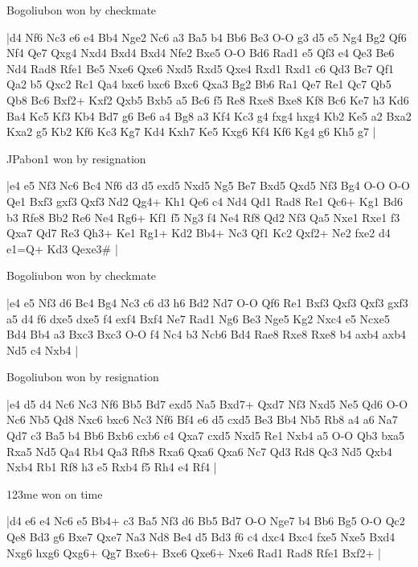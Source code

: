 \showboard

Bogoliubon won by checkmate

\makegametitle
|d4 Nf6 Nc3 e6 e4 Bb4 Nge2 Nc6 a3 Ba5 b4 Bb6 Be3 O-O g3 d5 e5 Ng4 Bg2 Qf6 Nf4 Qe7 Qxg4 Nxd4 Bxd4 Bxd4 Nfe2 Bxe5 O-O Bd6 Rad1 e5 Qf3 e4 Qe3 Be6 Nd4 Rad8 Rfe1 Be5 Nxe6 Qxe6 Nxd5 Rxd5 Qxe4 Rxd1 Rxd1 c6 Qd3 Bc7 Qf1 Qa2 b5 Qxc2 Rc1 Qa4 bxc6 bxc6 Bxc6 Qxa3 Bg2 Bb6 Ra1 Qe7 Re1 Qc7 Qb5 Qb8 Bc6 Bxf2+ Kxf2 Qxb5 Bxb5 a5 Bc6 f5 Re8 Rxe8 Bxe8 Kf8 Bc6 Ke7 h3 Kd6 Ba4 Kc5 Kf3 Kb4 Bd7 g6 Be6 a4 Bg8 a3 Kf4 Kc3 g4 fxg4 hxg4 Kb2 Ke5 a2 Bxa2 Kxa2 g5 Kb2 Kf6 Kc3 Kg7 Kd4 Kxh7 Ke5 Kxg6 Kf4 Kf6 Kg4 g6 Kh5 g7  |

\showboard

JPabon1 won by resignation

\makegametitle
|e4 e5 Nf3 Nc6 Bc4 Nf6 d3 d5 exd5 Nxd5 Ng5 Be7 Bxd5 Qxd5 Nf3 Bg4 O-O O-O Qe1 Bxf3 gxf3 Qxf3 Nd2 Qg4+ Kh1 Qe6 c4 Nd4 Qd1 Rad8 Re1 Qc6+ Kg1 Bd6 b3 Rfe8 Bb2 Re6 Ne4 Rg6+ Kf1 f5 Ng3 f4 Ne4 Rf8 Qd2 Nf3 Qa5 Nxe1 Rxe1 f3 Qxa7 Qd7 Re3 Qh3+ Ke1 Rg1+ Kd2 Bb4+ Nc3 Qf1 Kc2 Qxf2+ Ne2 fxe2 d4 e1=Q+ Kd3 Qexe3\#  |

\showboard

Bogoliubon won by checkmate

\makegametitle
|e4 e5 Nf3 d6 Bc4 Bg4 Nc3 c6 d3 h6 Bd2 Nd7 O-O Qf6 Re1 Bxf3 Qxf3 Qxf3 gxf3 a5 d4 f6 dxe5 dxe5 f4 exf4 Bxf4 Ne7 Rad1 Ng6 Be3 Nge5 Kg2 Nxc4 e5 Ncxe5 Bd4 Bb4 a3 Bxc3 Bxc3 O-O f4 Nc4 b3 Ncb6 Bd4 Rae8 Rxe8 Rxe8 b4 axb4 axb4 Nd5 c4 Nxb4  |

\showboard

Bogoliubon won by resignation

\makegametitle
|e4 d5 d4 Nc6 Nc3 Nf6 Bb5 Bd7 exd5 Na5 Bxd7+ Qxd7 Nf3 Nxd5 Ne5 Qd6 O-O Nc6 Nb5 Qd8 Nxc6 bxc6 Nc3 Nf6 Bf4 e6 d5 cxd5 Be3 Bb4 Nb5 Rb8 a4 a6 Na7 Qd7 c3 Ba5 b4 Bb6 Bxb6 cxb6 c4 Qxa7 cxd5 Nxd5 Re1 Nxb4 a5 O-O Qb3 bxa5 Rxa5 Nd5 Qa4 Rb4 Qa3 Rfb8 Rxa6 Qxa6 Qxa6 Nc7 Qd3 Rd8 Qc3 Nd5 Qxb4 Nxb4 Rb1 Rf8 h3 e5 Rxb4 f5 Rh4 e4 Rf4  |

\showboard

123me won on time

\makegametitle
|d4 e6 e4 Nc6 e5 Bb4+ c3 Ba5 Nf3 d6 Bb5 Bd7 O-O Nge7 b4 Bb6 Bg5 O-O Qc2 Qe8 Bd3 g6 Bxe7 Qxe7 Na3 Nd8 Be4 d5 Bd3 f6 c4 dxc4 Bxc4 fxe5 Nxe5 Bxd4 Nxg6 hxg6 Qxg6+ Qg7 Bxe6+ Bxe6 Qxe6+ Nxe6 Rad1 Rad8 Rfe1 Bxf2+  |

